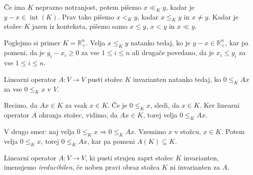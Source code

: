 \documentclass[mat2, tisk]{fmfdelo}
\begin{document}
Če ima \(K\) neprazno notranjost, potem pišemo \(x \ll_K y\), kadar je
\(y - x \in \operatorname{int}(K)\). Prav tako pišemo \(x <_K y\), kadar
\(x \leq_K y\) in \(x \neq y\). Kadar je stožec \(K\) jasen iz konteksta,
pišemo samo \(x \leq y\), \(x < y\) in \(x \ll y\).

\begin{zgled}
  Poglejmo si primer \(K = \mathbb{R}^n_+\). Velja \(x \leq_K y\) natanko tedaj, 
  ko je $y - x \in \mathbb{R}^n_+$, kar pa pomeni, da je \(y_i - x_i \geq 0\) 
  za vse \(1 \leq i \leq n\) ali drugače povedano, da je \(x_i \leq y_i\) 
  za vse \(1 \leq i \leq n\). 
\end{zgled}

\begin{trditev}
  Linearni operator \(A : V \to V\) pusti stožec \(K\)
  invarianten natanko tedaj, ko \(0 \leq_K Ax\) za vse \(0 \leq_K x\) v \(V\).
\end{trditev}
\begin{dokaz}
  Recimo, da $Ax \in K$ za vsak $x \in K$. Če je \(0 \leq_K x\), sledi, 
  da $ x \in K$. Ker linearni operator $A$ ohranja stožec, vidimo, da 
  $Ax \in K$, torej velja \(0 \leq_K Ax\).

  V drugo smer: naj velja $0 \leq_K x \Rightarrow 0 \leq_K Ax$. Vzemimo 
  $x$ v stožcu, $x \in K$. Potem velja \(0 \leq_K x\), torej \(0 \leq_K Ax\), 
  kar pa pomeni $A(K) \subseteq K$.
\end{dokaz}

\begin{definicija}
Linearni operator \(A : V \to V\), ki pusti strnjen zaprt stožec \(K\) 
invarianten, imenujemo \emph{ireducibilen}, če noben pravi obraz stožca \(K\)
ni invarianten za \(A\).
\end{definicija}
\end{document}
